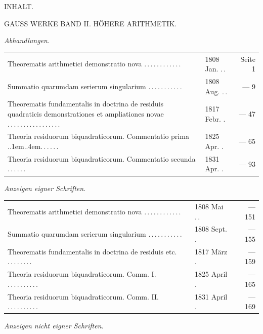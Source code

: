 \clearpage
\renewcommand{\BookRunningTitle}{Inhalt.}
\begin{center}\Large INHALT.\par\medskip
\large GAUSS WERKE BAND II. HÖHERE ARITHMETIK.
\end{center}
\par\medskip{}\textit{Abhandlungen.}
\begingroup\fontsize{10}{13}\selectfont
\begin{longtable}{@{}p{.60\linewidth}@{\quad}p{.24\linewidth}@{\quad}r@{}}
Theorematis arithmetici demonstratio nova .\,.\,.\,.\,.\,.\,.\,.\,.\,.\,.\,. & 1808 Jan. .\,. & Seite 1 \\[3pt]
Summatio quarumdam serierum singularium .\,.\,.\,.\,.\,.\,.\,.\,.\,.\,. & 1808 Aug. .\,. & — 9 \\[3pt]
Theorematis fundamentalis in doctrina de residuis quadraticis demonstrationes et ampliationes novae .\,.\,.\,.\,.\,.\,.\,.\,.\,.\,.\,.\,.\,.\,.\,.\,. & 1817 Febr. . & — 47 \\[3pt]
Theoria residuorum biquadraticorum. Commentatio prima .\kern.1em.\kern.4em.\,.\,.\,.\,.\,. & 1825 Apr. . & — 65 \\[3pt]
Theoria residuorum biquadraticorum. Commentatio secunda .\,.\,.\,.\,.\,. & 1831 Apr. . & — 93 \\[3pt]
\end{longtable}\endgroup
\par\medskip{}\textit{Anzeigen eigner Schriften.}
\begingroup\fontsize{10}{13}\selectfont
\begin{longtable}{@{}p{.60\linewidth}@{\quad}p{.24\linewidth}@{\quad}r@{}}
Theorematis arithmetici demonstratio nova .\,.\,.\,.\,.\,.\,.\,.\,.\,.\,.\,. & 1808 Mai .\,. & — 151 \\[3pt]
Summatio quarumdam serierum singularium .\,.\,.\,.\,.\,.\,.\,.\,.\,.\,. & 1808 Sept. . & — 155 \\[3pt]
Theorematis fundamentalis in doctrina de residuis etc. .\,.\,.\,.\,.\,.\,.\,. & 1817 März . & — 159 \\[3pt]
Theoria residuorum biquadraticorum. Comm. I. .\,.\,.\,.\,.\,.\,.\,.\,.\,. & 1825 April . & — 165 \\[3pt]
Theoria residuorum biquadraticorum. Comm. II. .\,.\,.\,.\,.\,.\,.\,.\,.\,. & 1831 April . & — 169 \\[3pt]
\end{longtable}\endgroup
\par\medskip{}\textit{Anzeigen nicht eigner Schriften.}
